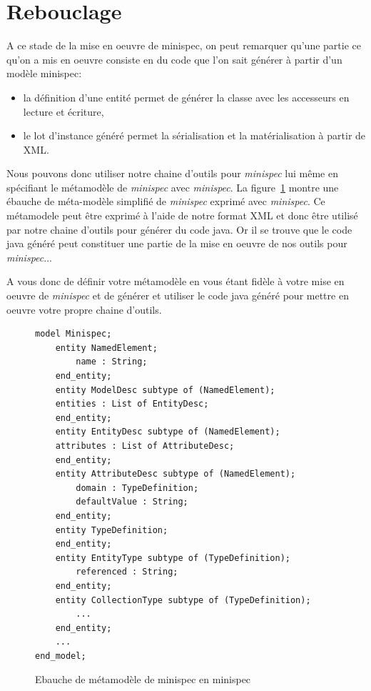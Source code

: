 \documentclass[12pt]{article}
\begin{document}
\section{Rebouclage}
A ce stade de la mise en oeuvre de minispec, on peut remarquer qu'une partie ce qu'on a mis en oeuvre consiste en du code que l'on sait générer à partir d'un modèle minispec:
\begin{itemize}
	\item la définition d'une entité permet de générer la classe avec les accesseurs en lecture et écriture,
	\item le lot d'instance généré permet la sérialisation et la matérialisation à partir de XML.
\end{itemize}

Nous pouvons donc utiliser notre chaine d'outils pour \textit{minispec} lui même en spécifiant le métamodèle de \textit{minispec} avec \textit{minispec}. La figure~\ref{fig:minispec-en-minispec} montre une ébauche de méta-modèle simplifié de \textit{minispec} exprimé avec \textit{minispec}. Ce métamodele peut être exprimé à l'aide de notre format XML et donc être utilisé par notre chaine d'outils pour générer du code java. Or il se trouve que le code java généré peut constituer une partie de la mise en oeuvre de nos outils pour \textit{minispec}...

A vous donc de définir votre métamodèle en vous étant fidèle à votre mise en oeuvre de \textit{minispec} et de générer et utiliser le code java généré pour mettre en oeuvre votre propre chaine d'outils.

\begin{figure}
\begin{lstlisting}[language=express]
model Minispec;
	entity NamedElement;
		name : String;
	end_entity;
	entity ModelDesc subtype of (NamedElement);
  	entities : List of EntityDesc;
	end_entity;
	entity EntityDesc subtype of (NamedElement);
  	attributes : List of AttributeDesc;
	end_entity;
	entity AttributeDesc subtype of (NamedElement);
		domain : TypeDefinition;
		defaultValue : String;
	end_entity;
	entity TypeDefinition;
	end_entity;
	entity EntityType subtype of (TypeDefinition);
		referenced : String;
	end_entity;
	entity CollectionType subtype of (TypeDefinition);
		...
	end_entity;
	...
end_model;

\end{lstlisting}
\caption{Ebauche de métamodèle de minispec en minispec}
\label{fig:minispec-en-minispec}
\end{figure}
\end{document}
